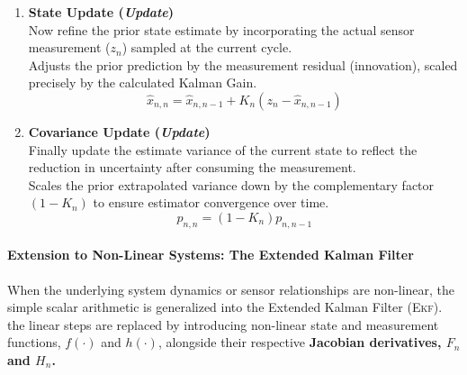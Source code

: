 \begin{enumerate}[label=\textbf{Step \arabic*:}, leftmargin=*, itemsep=1em]
	\item \textbf{State Update (\emph{Update})}\\
	Now refine the prior state estimate by incorporating the actual sensor measurement ($z_n$) sampled at the current cycle.\\
	Adjusts the prior prediction by the measurement residual (innovation), scaled precisely by the calculated Kalman Gain.
	\begin{equation}
		\hat{x}_{n,n} = \hat{x}_{n,n-1} + K_n\left(z_n - \hat{x}_{n,n-1}\right)
	\end{equation}
	
	\item \textbf{Covariance Update (\emph{Update})}\\
	Finally update the estimate variance of the current state to reflect the reduction in uncertainty after consuming the measurement.%
	\\
	Scales the prior extrapolated variance down by the complementary factor $(1 - K_n)$ to ensure estimator convergence over time.
	\begin{equation}
		p_{n,n} = (1 - K_n)p_{n,n-1}
	\end{equation}
	
\end{enumerate}


\paragraph{Extension to Non-Linear Systems: The Extended Kalman Filter}
\label{sec:extended_kalman_filter}

When the underlying system dynamics or sensor relationships are non-linear, the simple scalar arithmetic is generalized into the Extended Kalman Filter (\textsc{Ekf}).%
the linear steps are replaced by introducing non-linear state and measurement functions, $f(\cdot)$ and $h(\cdot)$, alongside their respective \textbf{Jacobian derivatives, $F_n$ and $H_n$.}


